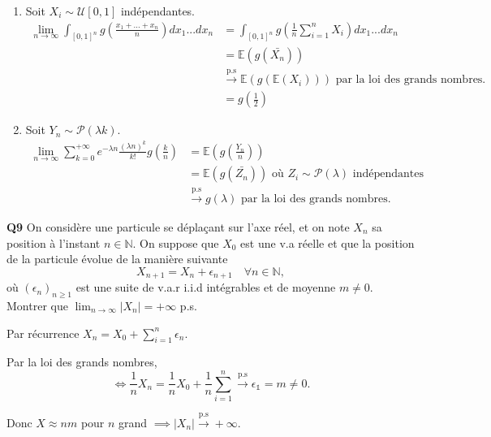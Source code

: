\documentclass[french]{article}
\begin{document}
\begin{enumerate}
	\item Soit $X_i \sim \mathcal{U}[0,1]$ indépendantes.
	\begin{align}
		\lim_{n \to \infty} \int_{[0,1]^n} g\left(\frac{x_1+...+x_n}{n}\right)dx_1...dx_n &= \int_{[0,1]^n} g(\frac{1}{n} \sum_{i=1}^{n}X_i) dx_1...dx_n\\
		&= \mathbb{E}(g(\bar{X_n}))\\
		&\xrightarrow{\text{p.s}} \mathbb{E}(g(\mathbb{E}(X_i)))  \text{ par la loi des grands nombres. }\\
		&= g\left(\frac{1}{2}\right)
	\end{align}
	
	\item Soit $Y_n \sim \mathcal{P}(\lambda k)$.
	\begin{align}
		\lim_{n \to \infty} \sum_{k=0}^{+\infty} e^{-\lambda n} \frac{(\lambda n)^k}{k!}g\left(\frac{k}{n}\right) &= \mathbb{E}\left(g\left(\frac{Y_n}{n}\right)\right)\\
		&= \mathbb{E}(g(\bar{Z_n})) \text{ où $Z_i \sim \mathcal{P}(\lambda)$ indépendantes }\\
		&\xrightarrow{\text{p.s}} g(\lambda) \text{ par la loi des grands nombres. }
	\end{align}
	
\end{enumerate}


\newpage

\begin{tcolorbox}[colback=gray!5!white,colframe=gray!75!black]
	\textbf{\large{Q9}}  On considère une particule se déplaçant sur l'axe réel, et on note $X_n$ sa position à l'instant $n \in \mathbb{N}$. On suppose que $X_0$ est une v.a réelle et que la position de la particule évolue de la manière suivante
	\[X_{n+1} = X_{n} + \epsilon_{n+1} \quad \forall n \in \mathbb{N},\]
	où $(\epsilon_n)_{n \geq 1}$ est une suite de v.a.r i.i.d intégrables et de moyenne $m \neq 0$.
	Montrer que $\lim_{n\to\infty}|X_n| = +\infty$ p.s.
\end{tcolorbox}

Par récurrence $X_n = X_0 + \sum_{i=1}^{n} \epsilon_n$.

Par la loi des grands nombres,
\[\iff \frac{1}{n}X_n = \frac{1}{n}X_0 + \frac{1}{n}\sum_{i=1}^{n} \xrightarrow{\text{p.s}} \mathbb{\epsilon_1} = m \neq 0.\]

Donc $X \approx nm$ pour $n$ grand $\implies |X_n| \xrightarrow{\text{p.s}} +\infty$.
\end{document}
